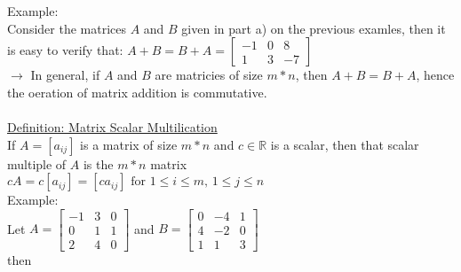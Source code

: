 \documentclass{jhwhw}
\begin{document}
Example:\\
Consider the matrices \(A\) and \(B\) given in part a) on the previous examles, then it is easy to verify that: \(A+B = B+A = \begin{bmatrix} -1 & 0 & 8 \\  1 & 3 & -7 \end{bmatrix}\)\\

\(\rightarrow\) In general, if \(A\) and \(B\) are matricies of size \(m*n\), then \(A+B=B+A\), hence the oeration of matrix addition is commutative.\\ \\

\underline{Definition: Matrix Scalar Multilication}\\
If \(A = [a_{ij}]\) is a matrix of size \(m*n\) and \(c \in \mathbb{R}\) is a scalar, then that scalar multiple of \(A\) is the \(m*n\) matrix\\

\(cA = c[a_{ij}] = [c a_{ij}] \text{ for } 1 \leq i \leq m, \, 1 \leq j \leq n\)
\\

Example:
\\
Let \(A = \begin{bmatrix} -1 & 3 & 0 \\ 0 & 1 & 1 \\ 2 & 4 & 0 \end{bmatrix}\) and \(B = \begin{bmatrix} 0 & -4 & 1 \\ 4 & -2 & 0 \\ 1 & 1 & 3 \end{bmatrix}\)\\
then\\
\end{document}
